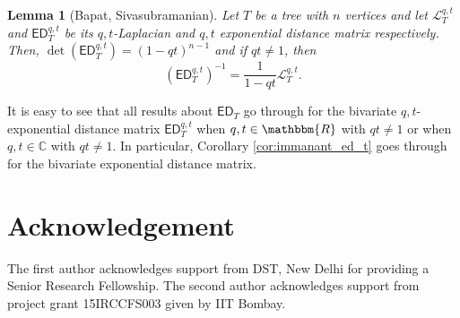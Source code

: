 \documentclass[12pt]{article}
\newtheorem{lemma}[theorem]{Lemma}
\newcommand{\ED}{ \mathsf{ED}}
\newcommand{\sL}{  \mathcal{ L}}
\newcommand{\RR}{ \mathbbm{R}}
\newcommand{\CC}{ \mathbb{C}}
\begin{document}
\begin{lemma}[Bapat, Sivasubramanian]
\label{lem:bapat_E_biv_inverse}
Let $T$ be a tree with $n$ vertices and
let $\sL_{T}^{q,t}$ and $\ED_T^{q,t}$ be its $q,t$-Laplacian 
and $q,t$ exponential distance matrix respectively. 
Then, $\det(\ED_T^{q,t}) = (1-qt)^{n-1}$ and 
if $qt \neq 1$, then 
$$(\ED_T^{q,t})^{-1}=\frac{1}{1-qt} \sL_{T}^{q,t}.$$
\end{lemma}

It is easy to see that all results about $\ED_T$ go through
for the bivariate $q,t$-exponential distance matrix $\ED_T^{q,t}$
when $q,t \in \RR$ with $qt \not= 1$ or when $q,t \in \CC$ with
$qt \not= 1$.  In particular, Corollary
\ref{cor:immanant_ed_t} goes through for the bivariate
exponential distance matrix.


\section*{Acknowledgement}
The first author acknowledges support from DST, New Delhi for 
providing a Senior Research Fellowship.
The second author acknowledges support from project grant
15IRCCFS003 given by IIT Bombay.





\end{document}
